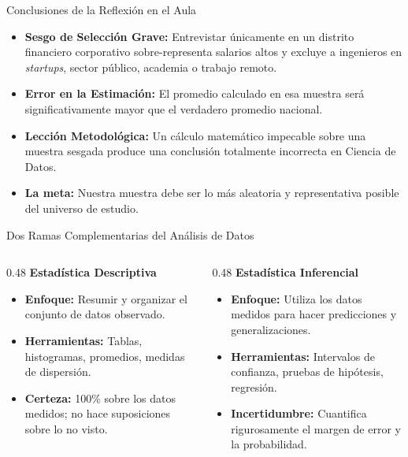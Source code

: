 \begin{frame}{Conclusiones de la Reflexión en el Aula}
  \begin{itemize}
    \item \textbf{Sesgo de Selección Grave:} Entrevistar únicamente en un distrito financiero corporativo sobre-representa salarios altos y excluye a ingenieros en \emph{startups}, sector público, academia o trabajo remoto. \pause
    \item \textbf{Error en la Estimación:} El promedio calculado en esa muestra será significativamente mayor que el verdadero promedio nacional. \pause
    \item \textbf{Lección Metodológica:} Un cálculo matemático impecable sobre una muestra sesgada produce una conclusión totalmente incorrecta en Ciencia de Datos. \pause
    \item \textbf{La meta:} Nuestra muestra debe ser lo más aleatoria y representativa posible del universo de estudio.
  \end{itemize}
\end{frame}

\begin{frame}{Dos Ramas Complementarias del Análisis de Datos}
  \begin{columns}[T]
    \begin{column}{0.48\textwidth}
      {\large \color{TecAzulOscuro}\textbf{Estadística Descriptiva}}
      \vspace{0.3em}
      \begin{itemize}
        \item \textbf{Enfoque:} Resumir y organizar el conjunto de datos observado. \pause
        \item \textbf{Herramientas:} Tablas, histogramas, promedios, medidas de dispersión. \pause
        \item \textbf{Certeza:} 100\% sobre los datos medidos; no hace suposiciones sobre lo no visto.
      \end{itemize}
    \end{column}
    
    \begin{column}{0.48\textwidth}
      {\large \color{TecRojo}\textbf{Estadística Inferencial}}
      \vspace{0.3em}
      \begin{itemize}
        \item \textbf{Enfoque:} Utiliza los datos medidos para hacer predicciones y generalizaciones. \pause
        \item \textbf{Herramientas:} Intervalos de confianza, pruebas de hipótesis, regresión. \pause
        \item \textbf{Incertidumbre:} Cuantifica rigurosamente el margen de error y la probabilidad.
      \end{itemize}
    \end{column}
  \end{columns}
\end{frame}

